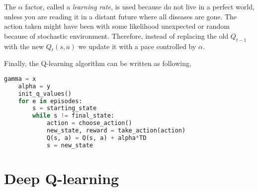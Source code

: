 The $\alpha$ factor, called a \emph{learning rate}, is used because do not live in a perfect world, unless you are reading it in a distant future where all diseases are gone. The action taken might have been with some likelihood unexpected or random because of stochastic environment. Therefore, instead of replacing the old $Q_{t-1}$ with the new $Q_t(s, a)$ we update it with a pace controlled by $\alpha$.

\vspave{.5cm}

Finally, the Q-learning algorithm can be written as following,

\begin{lstlisting}[language=Python]
    gamma = x
    alpha = y
    init_q_values()
    for e in episodes:
        s = starting_state
        while s != final_state:
            action = choose_action()
            new_state, reward = take_action(action)
            Q(s, a) = Q(s, a) + alpha*TD
            s = new_state
\end{lstlisting}

\section{Deep Q-learning}
\label{sec:deep-q-learn}

